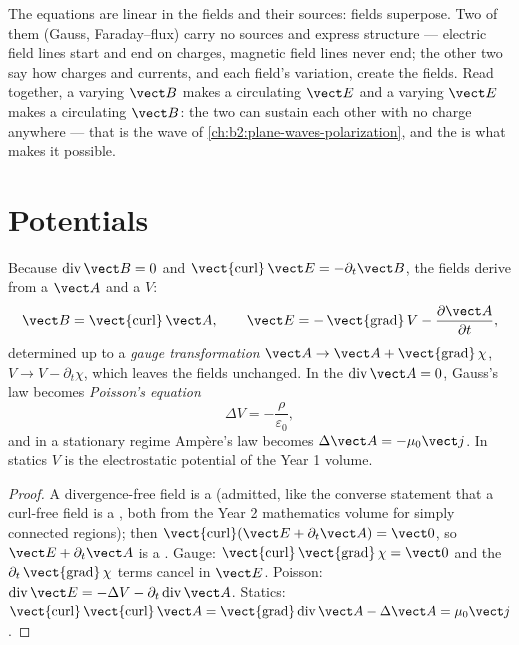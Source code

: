 \begin{remark}\label{rem:b2:maxwell-equations:linearity}
The equations are linear in the fields and their sources: fields
superpose. Two of them (Gauss, Faraday--flux) carry no sources and
express structure --- electric field lines start and end on charges,
magnetic field lines never end; the other two say how charges and
currents, and each field's variation, create the fields. Read
together, a varying $\vect B$ makes a circulating $\vect E$ and a varying
$\vect E$ makes a circulating $\vect B$: the two can sustain each other with
no charge anywhere --- that is the wave of
\cref{ch:b2:plane-waves-polarization}, and the  is
what makes it possible.
\end{remark}

\section{Potentials}

\begin{proposition}\label{prop:b2:maxwell-equations:potentials}
Because $\operatorname{div}\vect B = 0$ and $\operatorname{\vect{curl}}\vect E = -\partial_t
\vect B$, the fields derive from a \emph{} $\vect A$ and a
\emph{} $V$:
\[
\vect B = \operatorname{\vect{curl}}\vect A , \qquad
\vect E = -\operatorname{\vect{grad}}V - \frac{\partial\vect A}{\partial t} ,
\]
determined up to a \emph{gauge transformation} $\vect A \to \vect A +
\operatorname{\vect{grad}}\chi$, $V \to V - \partial_t\chi$, which leaves the fields
unchanged. In the \emph{} $\operatorname{div}\vect A = 0$, Gauss's
law becomes \emph{Poisson's equation}
\[
\Delta V = -\frac\rho{\varepsilon_0} ,
\]
and in a stationary regime Ampère's law becomes $\Delta\vect A = -\mu_0\vect j$.
In statics $V$ is the electrostatic potential of the Year 1 volume.
\end{proposition}

\begin{proof}
A divergence-free field is a  (admitted, like the converse
statement that a curl-free field is a , both from the Year 2
mathematics volume for simply connected regions); then $\operatorname{\vect{curl}}
(\vect E + \partial_t\vect A) = \vect 0$, so $\vect E + \partial_t\vect A$ is a .
Gauge: $\operatorname{\vect{curl}}\operatorname{\vect{grad}}\chi = \vect 0$ and the
$\partial_t\operatorname{\vect{grad}}\chi$ terms cancel in $\vect E$. Poisson: $\operatorname{div}
\vect E = -\Delta V - \partial_t\operatorname{div}\vect A$. Statics: $\operatorname{\vect{curl}}
\operatorname{\vect{curl}}\vect A = \operatorname{\vect{grad}}\operatorname{div}\vect A - \Delta\vect A
= \mu_0\vect j$.
\end{proof}

